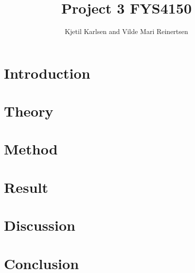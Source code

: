 

\title{Project 3 FYS4150}
\author{Kjetil Karlsen and Vilde Mari Reinertsen}
\raggedbottom



\maketitle

\begin{abstract}







  
\tableofcontents
\end{abstract}

\twocolumn

\section{Introduction}


\section{Theory}


\section{Method}


\section{Result}


\section{Discussion}


\section{Conclusion}









